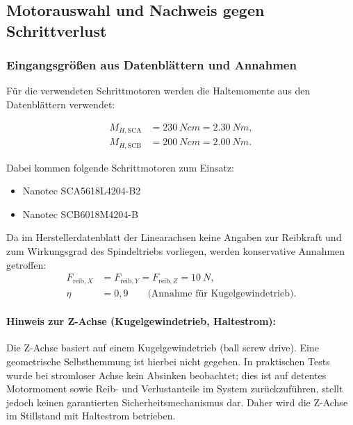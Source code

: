 \subsection{Motorauswahl und Nachweis gegen Schrittverlust}

\subsubsection{Eingangsgrößen aus Datenblättern und Annahmen}

Für die verwendeten Schrittmotoren werden die Haltemomente aus den Datenblättern verwendet:

\begin{align}
M_{H,\text{SCA}} &= \SI{230}{Ncm} = \SI{2,30}{Nm},\\
M_{H,\text{SCB}} &= \SI{200}{Ncm} = \SI{2,00}{Nm}.
\end{align}

\noindent
Dabei kommen folgende Schrittmotoren zum Einsatz:
\begin{itemize}
  \item Nanotec SCA5618L4204-B2 \cite{nanotec_sca5618}
  \item Nanotec SCB6018M4204-B \cite{nanotec_scb6018}
\end{itemize}


Da im Herstellerdatenblatt der Linearachsen keine Angaben zur Reibkraft und zum Wirkungsgrad des Spindeltriebs
vorliegen, werden konservative Annahmen getroffen:
\begin{align}
F_{\text{reib},X} &= F_{\text{reib},Y} = F_{\text{reib},Z} = \SI{10}{N},\\
\eta &= 0{,}9 \qquad \text{(Annahme für Kugelgewindetrieb)}.
\end{align}

\paragraph{Hinweis zur Z-Achse (Kugelgewindetrieb, Haltestrom):}
Die Z-Achse basiert auf einem Kugelgewindetrieb (ball screw drive). Eine geometrische Selbsthemmung ist hierbei
nicht gegeben. In praktischen Tests wurde bei stromloser Achse kein Absinken beobachtet; dies ist auf detentes
Motormoment sowie Reib- und Verlustanteile im System zurückzuführen, stellt jedoch keinen garantierten
Sicherheitsmechanismus dar. Daher wird die Z-Achse im Stillstand mit Haltestrom betrieben.

